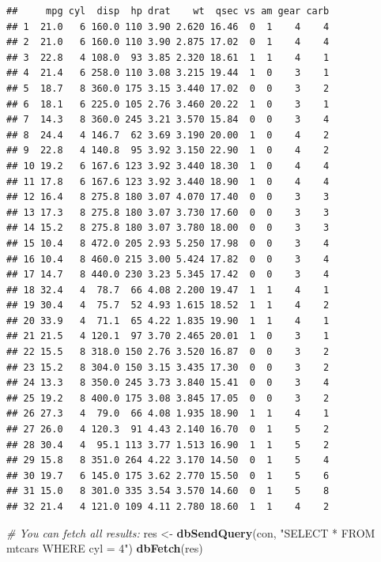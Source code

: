 \documentclass[
]{book}
\newenvironment{Shaded}{\begin{snugshade}}{\end{snugshade}}
\newcommand{\CommentTok}[1]{\textcolor[rgb]{0.56,0.35,0.01}{\textit{#1}}}
\newcommand{\FunctionTok}[1]{\textcolor[rgb]{0.13,0.29,0.53}{\textbf{#1}}}
\newcommand{\NormalTok}[1]{#1}
\newcommand{\OtherTok}[1]{\textcolor[rgb]{0.56,0.35,0.01}{#1}}
\newcommand{\StringTok}[1]{\textcolor[rgb]{0.31,0.60,0.02}{#1}}
\begin{document}
\begin{verbatim}
##     mpg cyl  disp  hp drat    wt  qsec vs am gear carb
## 1  21.0   6 160.0 110 3.90 2.620 16.46  0  1    4    4
## 2  21.0   6 160.0 110 3.90 2.875 17.02  0  1    4    4
## 3  22.8   4 108.0  93 3.85 2.320 18.61  1  1    4    1
## 4  21.4   6 258.0 110 3.08 3.215 19.44  1  0    3    1
## 5  18.7   8 360.0 175 3.15 3.440 17.02  0  0    3    2
## 6  18.1   6 225.0 105 2.76 3.460 20.22  1  0    3    1
## 7  14.3   8 360.0 245 3.21 3.570 15.84  0  0    3    4
## 8  24.4   4 146.7  62 3.69 3.190 20.00  1  0    4    2
## 9  22.8   4 140.8  95 3.92 3.150 22.90  1  0    4    2
## 10 19.2   6 167.6 123 3.92 3.440 18.30  1  0    4    4
## 11 17.8   6 167.6 123 3.92 3.440 18.90  1  0    4    4
## 12 16.4   8 275.8 180 3.07 4.070 17.40  0  0    3    3
## 13 17.3   8 275.8 180 3.07 3.730 17.60  0  0    3    3
## 14 15.2   8 275.8 180 3.07 3.780 18.00  0  0    3    3
## 15 10.4   8 472.0 205 2.93 5.250 17.98  0  0    3    4
## 16 10.4   8 460.0 215 3.00 5.424 17.82  0  0    3    4
## 17 14.7   8 440.0 230 3.23 5.345 17.42  0  0    3    4
## 18 32.4   4  78.7  66 4.08 2.200 19.47  1  1    4    1
## 19 30.4   4  75.7  52 4.93 1.615 18.52  1  1    4    2
## 20 33.9   4  71.1  65 4.22 1.835 19.90  1  1    4    1
## 21 21.5   4 120.1  97 3.70 2.465 20.01  1  0    3    1
## 22 15.5   8 318.0 150 2.76 3.520 16.87  0  0    3    2
## 23 15.2   8 304.0 150 3.15 3.435 17.30  0  0    3    2
## 24 13.3   8 350.0 245 3.73 3.840 15.41  0  0    3    4
## 25 19.2   8 400.0 175 3.08 3.845 17.05  0  0    3    2
## 26 27.3   4  79.0  66 4.08 1.935 18.90  1  1    4    1
## 27 26.0   4 120.3  91 4.43 2.140 16.70  0  1    5    2
## 28 30.4   4  95.1 113 3.77 1.513 16.90  1  1    5    2
## 29 15.8   8 351.0 264 4.22 3.170 14.50  0  1    5    4
## 30 19.7   6 145.0 175 3.62 2.770 15.50  0  1    5    6
## 31 15.0   8 301.0 335 3.54 3.570 14.60  0  1    5    8
## 32 21.4   4 121.0 109 4.11 2.780 18.60  1  1    4    2
\end{verbatim}

\begin{Shaded}
\begin{Highlighting}[]
\CommentTok{\# You can fetch all results:}
\NormalTok{res }\OtherTok{\textless{}{-}} \FunctionTok{dbSendQuery}\NormalTok{(con, }\StringTok{"SELECT * FROM mtcars WHERE cyl = 4"}\NormalTok{)}
\FunctionTok{dbFetch}\NormalTok{(res)}
\end{Highlighting}
\end{Shaded}
\end{document}
